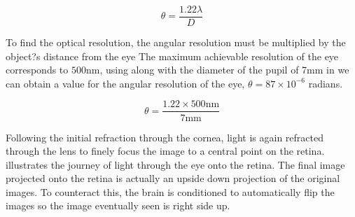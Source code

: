 \begin{equation}
\theta=\frac{1.22\lambda}{D}
\label{eq:res_limit}
\end{equation}

To find the optical resolution, the angular resolution must be multiplied by the
object?s distance from the eye The maximum achievable resolution of the eye
corresponds  to $500\textrm{nm}$, using  along with the
diameter of the pupil of 7mm in  we can obtain a value for
the angular resolution of the eye, $\theta=87\times 10^{-6}$ radians.

\begin{equation}
\theta=\frac{1.22\times 500\textrm{nm}}{7\textrm{mm}}
\label{eq:eye_res}
\end{equation}

Following the initial refraction through the cornea, light is again refracted
through the lens to finely focus the image to a central point on the retina.
 illustrates the journey of light through the eye
onto the retina. The final image projected onto the retina is actually an
upside down projection of the original images. To counteract this, the
brain is conditioned to automatically flip the images so the image eventually
seen is right side up.


